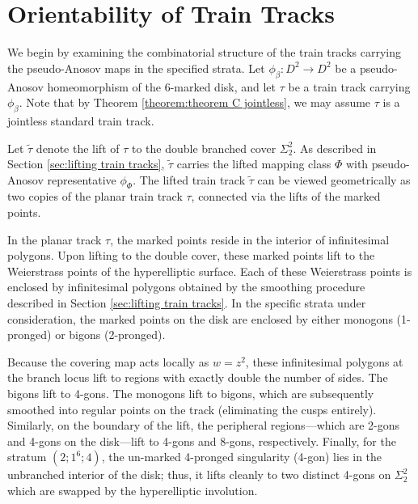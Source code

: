 \section{Orientability of Train Tracks}

We begin by examining the combinatorial structure of the train tracks carrying the pseudo-Anosov maps in the specified strata. Let $\phi_\beta: D^2 \to D^2$ be a pseudo-Anosov homeomorphism of the 6-marked disk, and let $\tau$ be a train track carrying $\phi_\beta$. Note that by Theorem \ref{theorem:theorem C jointless}, we may assume $\tau$ is a jointless standard train track.

Let $\tilde{\tau}$ denote the lift of $\tau$ to the double branched cover $\Sigma_2^2$. As described in Section \ref{sec:lifting train tracks}, $\tilde{\tau}$ carries the lifted mapping class $\Phi$ with pseudo-Anosov representative $\phi_\Phi$. The lifted train track $\tilde{\tau}$ can be viewed geometrically as two copies of the planar train track $\tau$, connected via the lifts of the marked points.

In the planar track $\tau$, the marked points reside in the interior of infinitesimal polygons. Upon lifting to the double cover, these marked points lift to the Weierstrass points of the hyperelliptic surface. Each of these Weierstrass points is enclosed by infinitesimal polygons obtained by the smoothing procedure described in Section \ref{sec:lifting train tracks}. In the specific strata under consideration, the marked points on the disk are enclosed by either monogons (1-pronged) or bigons (2-pronged).

Because the covering map acts locally as $w = z^2$, these infinitesimal polygons at the branch locus lift to regions with exactly double the number of sides. The bigons lift to 4-gons. The monogons lift to bigons, which are subsequently smoothed into regular points on the track (eliminating the cusps entirely). Similarly, on the boundary of the lift, the peripheral regions---which are 2-gons and 4-gons on the disk---lift to 4-gons and 8-gons, respectively. Finally, for the stratum $(2; 1^6; 4)$, the un-marked 4-pronged singularity (4-gon) lies in the unbranched interior of the disk; thus, it lifts cleanly to two distinct 4-gons on $\Sigma_2^2$ which are swapped by the hyperelliptic involution.

